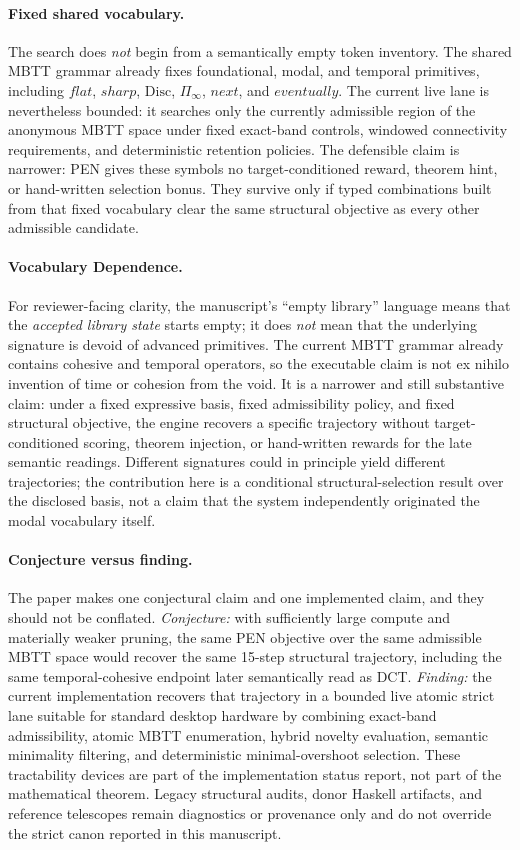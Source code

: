 \documentclass[11pt,a4paper]{article}
\def\flat{flat}%
\def\sharp{sharp}%
\def\bigcirc{next}%
\def\Diamond{eventually}%
\theoremstyle{plain}
\theoremstyle{definition}
\theoremstyle{remark}
\newcommand{\Disc}{\mathrm{Disc}}
\begin{document}
\paragraph{Fixed shared vocabulary.}
The search does \emph{not} begin from a semantically empty token inventory.
The shared MBTT grammar already fixes foundational, modal, and temporal primitives, including $\flat$, $\sharp$, $\Disc$, $\Pi_{\!\infty}$, $\bigcirc$, and $\Diamond$.
The current live lane is nevertheless bounded: it searches only the currently admissible region of the anonymous MBTT space under fixed exact-band controls, windowed connectivity requirements, and deterministic retention policies.
The defensible claim is narrower: PEN gives these symbols no target-conditioned reward, theorem hint, or hand-written selection bonus.
They survive only if typed combinations built from that fixed vocabulary clear the same structural objective as every other admissible candidate.

\paragraph{Vocabulary Dependence.}
For reviewer-facing clarity, the manuscript's ``empty library'' language means that the \emph{accepted library state} starts empty; it does \emph{not} mean that the underlying signature is devoid of advanced primitives.
The current MBTT grammar already contains cohesive and temporal operators, so the executable claim is not ex nihilo invention of time or cohesion from the void.
It is a narrower and still substantive claim: under a fixed expressive basis, fixed admissibility policy, and fixed structural objective, the engine recovers a specific trajectory without target-conditioned scoring, theorem injection, or hand-written rewards for the late semantic readings.
Different signatures could in principle yield different trajectories; the contribution here is a conditional structural-selection result over the disclosed basis, not a claim that the system independently originated the modal vocabulary itself.

\paragraph{Conjecture versus finding.}
The paper makes one conjectural claim and one implemented claim, and they should not be conflated.
\emph{Conjecture:} with sufficiently large compute and materially weaker pruning, the same PEN objective over the same admissible MBTT space would recover the same 15-step structural trajectory, including the same temporal-cohesive endpoint later semantically read as DCT.
\emph{Finding:} the current implementation recovers that trajectory in a bounded live atomic strict lane suitable for standard desktop hardware by combining exact-band admissibility, atomic MBTT enumeration, hybrid novelty evaluation, semantic minimality filtering, and deterministic minimal-overshoot selection.
These tractability devices are part of the implementation status report, not part of the mathematical theorem.
Legacy structural audits, donor Haskell artifacts, and reference telescopes remain diagnostics or provenance only and do not override the strict canon reported in this manuscript.
\end{document}
